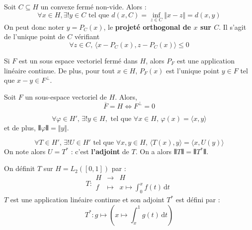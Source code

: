 
  \begin{theorem}
    Soit $C \subseteq H$ un convexe fermé non-vide. Alors :
    \[ \forall x \in H, \exists! y \in C \text{ tel que } d(x, C) = \inf_{z \in C} \Vert x - z \Vert = d(x, y) \]
    On peut donc noter $y = P_C(x)$, le \textbf{projeté orthogonal de $x$ sur $C$}. Il s'agit de l'unique point de $C$ vérifiant
    \[ \forall z \in C, \, \langle x - P_C(x), z - P_C(x) \rangle \leq 0 \]
  \end{theorem}

  \begin{theorem}
    Si $F$ est un sous espace vectoriel fermé dans $H$, alors $P_F$ est une application linéaire continue. De plus, pour tout $x \in H$, $P_F(x)$ est l'unique point $y \in F$ tel que $x-y \in F^\perp$.
  \end{theorem}

  \begin{corollary}
    Soit $F$ un sous-espace vectoriel de $H$. Alors,
    \[ \overline{F} = H \iff F^\perp = 0 \]
  \end{corollary}

  \begin{theorem}
    \[ \forall \varphi \in H', \, \exists! y \in H, \text{ tel que } \forall x \in H, \, \varphi(x) = \langle x, y \rangle \]
    et de plus, $\VERT \varphi \VERT = \Vert y \Vert$.
  \end{theorem}

  \begin{corollary}
    \[ \forall T \in H', \, \exists! U \in H' \text{ tel que } \forall x, y \in H, \, \langle T(x), y \rangle = \langle x, U(y) \rangle \]
    On note alors $U = T^*$ : c'est \textbf{l'adjoint} de $T$. On a alors $\VERT T \VERT = \VERT T^* \VERT$.
  \end{corollary}


  \begin{example}
    On définit $T$ sur $H = L_2([0,1])$ par :
    \[
    T : \begin{array}{ccc}
      H &\rightarrow& H \\
      f &\mapsto& x \mapsto \int_{0}^{x} f(t) \, \mathrm{d}t
    \end{array}
    \]
    $T$ est une application linéaire continue et son adjoint $T^*$ est défini par :
    \[ T^* : g \mapsto \left(x \mapsto \int_x^1 g(t) \, \mathrm{d}t \right) \]
  \end{example}

